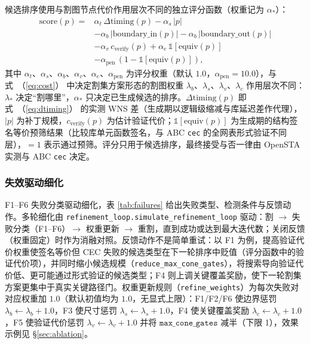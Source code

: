 \documentclass[journal]{IEEEtran}
\renewcommand{\eqref}[1]{\textup{（\ref{#1}）}}
\begin{document}
候选排序使用与割图节点代价作用层次不同的独立评分函数（权重记为 $\alpha_*$）：
{\small
\begin{equation}\label{eq:score}
\begin{split}
\mathrm{score}(p) = {}&\alpha_t\,\Delta\mathrm{timing}(p) - \alpha_s\,|p| \\
&- \alpha_b\,|\mathrm{boundary\_in}(p)| - \alpha_b\,|\mathrm{boundary\_out}(p)| \\
&- \alpha_v\,c_{\mathrm{verify}}(p) + \alpha_e\,\mathbb{1}[\mathrm{equiv}(p)] \\
&- \alpha_{\mathrm{pen}}\,(1-\mathbb{1}[\mathrm{equiv}(p)]),
\end{split}
\end{equation}
}
其中 $\alpha_t$、$\alpha_s$、$\alpha_b$、$\alpha_v$、$\alpha_e$、$\alpha_{\mathrm{pen}}$ 为评分权重（默认 $1.0$，$\alpha_{\mathrm{pen}}=10.0$），与式~\eqref{eq:cost} 中决定割集方案形态的割图权重 $\lambda_b$、$\lambda_s$、$\lambda_v$、$\lambda_c$ 作用层次不同：$\lambda_*$ 决定“割哪里”，$\alpha_*$ 只决定已生成候选的排序。$\Delta\mathrm{timing}(p)$ 即式~\eqref{eq:dtiming} 的实测 WNS 差（生成期以逻辑级缩减与库延迟差作代理），$|p|$ 为补丁规模，$c_{\mathrm{verify}}(p)$ 为估计验证代价；$\mathbb{1}[\mathrm{equiv}(p)]$ 为生成期的结构签名等价预筛结果（比较库单元函数签名，与 ABC \texttt{cec} 的全网表形式验证不同层），$=1$ 表示通过预筛。评分只用于候选排序，最终接受与否一律由 OpenSTA 实测与 ABC \texttt{cec} 决定。

\subsubsection{失效驱动细化}
F1--F6 失败分类驱动细化，表 \ref{tab:failures} 给出失败类型、检测条件与反馈动作。多轮细化由 \texttt{refinement\_loop.simulate\_refinement\_loop} 驱动：割 $\rightarrow$ 失败分类（F1--F6）$\rightarrow$ 权重更新 $\rightarrow$ 重割，直到成功或达到最大迭代数；关闭反馈（权重固定）时作为消融对照。反馈动作不是简单重试：以 F1 为例，提高验证代价权重使签名等价但 CEC 失败的候选类型在下一轮排序中贬值（评分函数中的验证代价项），并同时缩小候选规模（\texttt{reduce\_max\_cone\_gates}），将搜索导向验证代价低、更可能通过形式验证的候选类型；F4 则上调关键覆盖奖励，使下一轮割集方案更集中于真实关键路径门。权重更新规则（\texttt{refine\_weights}）为每次失败对对应权重加 $1.0$（默认初值均为 $1.0$，无显式上限）：F1/F2/F6 使边界惩罚 $\lambda_b\leftarrow\lambda_b+1.0$，F3 使尺寸惩罚 $\lambda_s\leftarrow\lambda_s+1.0$，F4 使关键覆盖奖励 $\lambda_c\leftarrow\lambda_c+1.0$，F5 使验证代价惩罚 $\lambda_v\leftarrow\lambda_v+1.0$ 并将 $\texttt{max\_cone\_gates}$ 减半（下限 1），效果示例见 \S\ref{sec:ablation}。
\end{document}
